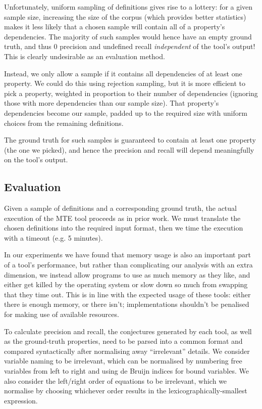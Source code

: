 Unfortunately, uniform sampling of definitions gives rise to a lottery: for a
given sample size, increasing the size of the corpus (which provides better
statistics) makes it less likely that a chosen sample will contain all of
a property's dependencies. The majority of such samples would hence have an empty
ground truth, and thus $0$ precision and undefined recall \emph{independent} of
the tool's output! This is clearly undesirable as an evaluation method.

Instead, we only allow a sample if it contains all dependencies of at least one
property. We could do this using rejection sampling, but it is more efficient to
pick a property, weighted in proportion to their number of dependencies
(ignoring those with more dependencies than our sample size). That property's
dependencies become our sample, padded up to the required size with uniform
choices from the remaining definitions.

The ground truth for such samples is guaranteed to contain at least one property
(the one we picked), and hence the precision and recall will depend meaningfully
on the tool's output.

\subsection{Evaluation}
\label{section:evaluation}

Given a sample of definitions and a corresponding ground truth, the actual
execution of the MTE tool proceeds as in prior work. We must translate the
chosen definitions into the required input format, then we time the execution
with a timeout (e.g. 5 minutes).

In our experiments we have found that memory usage is also an important part of
a tool's performance, but rather than complicating our analysis with an extra
dimension, we instead allow programs to use as much memory as they like, and
either get killed by the operating system or slow down so much from swapping
that they time out. This is in line with the expected usage of these tools:
either there is enough memory, or there isn't; implementations shouldn't be
penalised for making use of available resources.

To calculate precision and recall, the conjectures generated by each tool, as
well as the ground-truth properties, need to be parsed into a common format and
compared syntactically after normalising away ``irrelevant'' details. We
consider variable naming to be irrelevant, which can be normalised by numbering
free variables from left to right and using de Bruijn indices for bound
variables. We also consider the left/right order of equations to be irrelevant,
which we normalise by choosing whichever order results in the
lexicographically-smallest expression.

